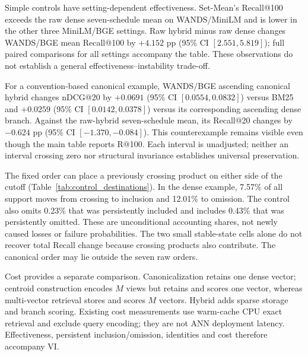 \begin{table}[t]
\centering\normalsize\setlength{\tabcolsep}{6pt}\renewcommand{\arraystretch}{1.05}
\caption{Common-support controls. Recall (R) and VI are percentages; nDCG uses 0--1. R@100/VI@100 assess candidate inclusion, whereas nDCG@20 assesses ranking near the top. All fixed controls have structural VI=0. The companion includes R@20, paired intervals, source-order references, GTE and every view budget.}
\label{tab:strategy_joint}

\end{table}

Simple controls have setting-dependent effectiveness. Set-Mean's Recall@100 exceeds the raw dense seven-schedule mean on WANDS/MiniLM and is lower in the other three MiniLM/BGE settings. Raw hybrid minus raw dense changes WANDS/BGE mean Recall@100 by $+4.152$ pp (95\% CI $[2.551, 5.819]$); full paired comparisons for all settings accompany the table. These observations do not establish a general effectiveness--instability trade-off.

For a convention-based canonical example, WANDS/BGE ascending canonical hybrid changes nDCG@20 by $+0.0691$ (95\% CI $[0.0554, 0.0832]$) versus BM25 and $+0.0259$ (95\% CI $[0.0142, 0.0378]$) versus its corresponding ascending dense branch. Against the raw-hybrid seven-schedule mean, its Recall@20 changes by $-0.624$ pp (95\% CI $[-1.370,-0.084]$). This counterexample remains visible even though the main table reports R@100. Each interval is unadjusted; neither an interval crossing zero nor structural invariance establishes universal preservation.

\begin{table}[t]
\centering\small
\caption{One transition illustration: WANDS/MiniLM ascending at $K=20$. Cells are query-macro percentages of all highest-label support. Dense and hybrid use their own raw families; each six-cell block sums to 100\% before rounding.}
\label{tab:control_destinations}

\end{table}

The fixed order can place a previously crossing product on either side of the cutoff (Table~\ref{tab:control_destinations}). In the dense example, 7.57\% of all support moves from crossing to inclusion and 12.01\% to omission. The control also omits 0.23\% that was persistently included and includes 0.43\% that was persistently omitted. These are unconditional accounting shares, not newly caused losses or failure probabilities. The two small stable-state cells alone do not recover total Recall change because crossing products also contribute. The canonical order may lie outside the seven raw orders.

Cost provides a separate comparison. Canonicalization retains one dense vector; centroid construction encodes $M$ views but retains and scores one vector, whereas multi-vector retrieval stores and scores $M$ vectors. Hybrid adds sparse storage and branch scoring. Existing cost measurements use warm-cache CPU exact retrieval and exclude query encoding; they are not ANN deployment latency. Effectiveness, persistent inclusion/omission, identities and cost therefore accompany VI.
